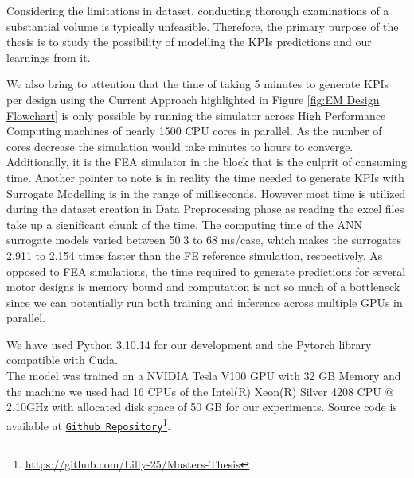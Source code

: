 \documentclass{report} %
\begin{document}
\vspace{1em} %

Considering the limitations in dataset, conducting thorough examinations of a substantial volume is typically unfeasible. 
Therefore, the primary purpose of the thesis is to study the possibility of modelling the \ac{KPI}s predictions and our learnings from it.

We also bring to attention that the time of taking 5 minutes to generate \ac{KPI}s per design using the Current Approach highlighted in Figure 
\ref{fig:EM Design Flowchart} is only possible by running the simulator across High Performance Computing machines of nearly 1500 CPU cores in parallel. 
As the number of cores decrease the simulation would take minutes to hours to converge. Additionally, it is the \ac{FEA} simulator in the block that is the culprit of 
consuming time. Another pointer to note is in reality the time needed to generate \ac{KPI}s with Surrogate Modelling is in the range of milliseconds. 
However most time is utilized during the dataset creation in Data Preprocessing phase as reading the excel files take up a significant chunk of the time.
The computing time of the ANN surrogate models varied between 50.3 to 68 ms/case, which makes the surrogates 2,911 to 2,154 times faster than the FE reference simulation, 
respectively. As opposed to \ac{FEA} simulations, the time required to generate predictions for several motor designs is memory bound 
and computation is not so much of a bottleneck since we can potentially run both training and inference across multiple GPUs in parallel.

We have used Python 3.10.14 for our development and the Pytorch library compatible with Cuda.\\
The model was trained on a NVIDIA Tesla V100 \ac{GPU} with 32 GB Memory and the machine we used had 16 CPUs of the Intel(R) Xeon(R) Silver 4208 CPU @ 2.10GHz 
with allocated disk space of 50 GB for our experiments.
Source code is available at \texttt{\href{https://github.com/Lilly-25/Masters-Thesis}{Github Repository}}\footnote{\url{https://github.com/Lilly-25/Masters-Thesis}}.

\end{document}
